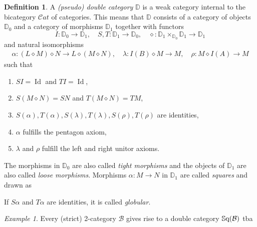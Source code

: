\documentclass[11pt]{report}
\theoremstyle{definition}
\newtheorem{definition}[theorem]{Definition}
\theoremstyle{remark}
\theoremstyle{remark}
\newtheorem*{example}{Example}
\begin{document}
\begin{definition}
A \emph{(pseudo) double category} $\mathbb{D}$ is a weak category internal to the bicategory $\mathcal{C}at$ of categories. This means that $\mathbb{D}$ consists of a category of objects $\mathbb{D}_0$ and a category of morphisms $\mathbb{D}_1$ together with functors
\begin{equation*}
I: \mathbb{D}_0 \to \mathbb{D}_1, \quad S,T: \mathbb{D}_1 \to \mathbb{D}_0, \quad \diamond: \mathbb{D}_1 \times_{\mathbb{D}_0} \mathbb{D}_1 \to \mathbb{D}_1
\end{equation*}
and natural isomorphisms
\begin{align*}
\alpha: (L \diamond M) \diamond N \to L \diamond (M \diamond N), \quad \lambda: I(B) \diamond M \to M, \quad \rho: M \diamond I(A) \to M
\end{align*}
such that
\begin{enumerate}[label=(\roman*)]
\item $SI = \operatorname{Id}$ and $TI = \operatorname{Id}$,
\item $S(M \diamond N) = SN$ and $T(M \diamond N) = TM$,
\item $S(\alpha), T(\alpha), S(\lambda), T(\lambda), S(\rho), T(\rho)$ are identities,
\item $\alpha$ fulfills the pentagon axiom,
\item $\lambda$ and $\rho$ fulfill the left and right unitor axioms.
\end{enumerate}
The morphisms in $\mathbb{D}_0$ are also called \emph{tight morphisms} and the objects of $\mathbb{D}_1$ are also called \emph{loose morphisms}. Morphisms $\alpha: M \to N$ in $\mathbb{D}_1$ are called \emph{squares} and drawn as
\begin{center}
\end{center}
If $S\alpha$ and $T\alpha$ are identities, it is called \emph{globular}.
\end{definition}

\begin{example}
Every (strict) 2-category $\mathcal{B}$ gives rise to a double category $\mathbb{S}\textnormal{q}(\mathcal{B})$ tba
\end{example}
\end{document}
